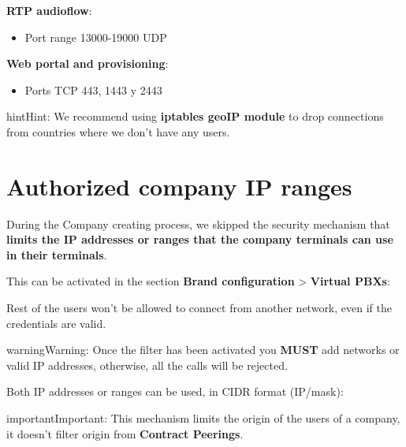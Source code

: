 \documentclass[letterpaper,10pt,english]{sphinxmanual}
\begin{document}
\textbf{RTP audioflow}:
\begin{itemize}
\item {} 
Port range 13000-19000 UDP

\end{itemize}

\textbf{Web portal and provisioning}:
\begin{itemize}
\item {} 
Ports TCP 443, 1443 y 2443

\end{itemize}

\begin{notice}{hint}{Hint:}
We recommend using \textbf{iptables geoIP module} to drop connections from
countries where we don't have any users.
\end{notice}


\section{Authorized company IP ranges}
\label{security/index:authorized-company-ip-ranges}
During the Company creating process, we skipped the security mechanism that
\textbf{limits the IP addresses or ranges that the company terminals can use
in their terminals}.

This can be activated in the section \textbf{Brand configuration} \textgreater{} \textbf{Virtual PBXs}:


Rest of the users won't be allowed to connect from another network, even if the
credentials are valid.

\begin{notice}{warning}{Warning:}
Once the filter has been activated you \textbf{MUST} add networks or
valid IP addresses, otherwise, all the calls will be rejected.
\end{notice}

\noindent{}

Both IP addresses or ranges can be used, in CIDR format (IP/mask):

\noindent{}

\begin{notice}{important}{Important:}
This mechanism limits the origin of the users of a company, it
doesn't filter origin from \textbf{Contract Peerings}.
\end{notice}
\end{document}
